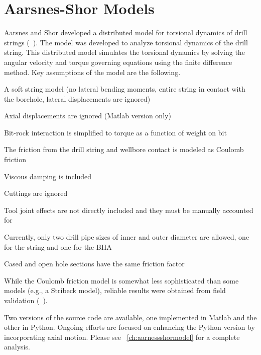 \section{Aarsnes-Shor Models}
Aarsnes and Shor developed a distributed model for torsional dynamics of drill strings (~\cite{ref:aarsnes2017a}).  The model was developed to analyze torsional dynamics of the drill string.  This distributed model simulates the torsional dynamics by solving the angular velocity and torque governing equations using the finite difference method. Key assumptions of the model are the following.
\begin{bulletedlist}
	\item A soft string model (no lateral bending moments, entire string in contact with the borehole, lateral displacements are ignored)
	\item Axial displacements are ignored (Matlab version only)
	\item Bit-rock interaction is simplified to torque as a function of weight on bit
	\item The friction from the drill string and wellbore contact is modeled as Coulomb friction
    \item Viscous damping is included
    \item Cuttings are ignored
    \item Tool joint effects are not directly included and they must be manually accounted for
    \item Currently, only two drill pipe sizes of inner and outer diameter are allowed, one for the string and one for the BHA
    \item Cased and open hole sections have the same friction factor
\end{bulletedlist}

While the Coulomb friction model is somewhat less sophisticated than some models (e.g., a Stribeck model), reliable results were obtained from field validation (~\cite{ref:aarsnes2017a}).

Two versions of the source code are available, one implemented in Matlab and the other in Python.  Ongoing efforts are focused on enhancing the Python version by incorporating axial motion. Please see \chaptername~\ref{ch:aarnessshormodel} for a complete analysis.


